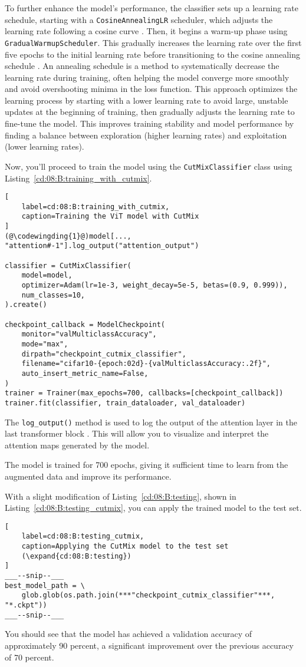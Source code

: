 To further enhance the model's performance, the classifier sets up a learning rate schedule, starting with a \lstinline{CosineAnnealingLR} scheduler, which adjusts the learning rate following a cosine curve . Then, it begins a warm-up phase using \lstinline{GradualWarmupScheduler}.  This gradually increases the learning rate over the first five epochs to the initial learning rate before transitioning to the cosine annealing schedule . An annealing schedule is a method to systematically decrease the learning rate during training, often helping the model converge more smoothly and avoid overshooting minima in the loss function. This approach optimizes the learning process by starting with a lower learning rate to avoid large, unstable updates at the beginning of training, then gradually adjusts the learning rate to fine-tune the model. This improves training stability and model performance by finding a balance between exploration (higher learning rates) and exploitation (lower learning rates).

Now, you'll proceed to train the model using the \lstinline{CutMixClassifier} class using Listing~\ref{cd:08:B:training_with_cutmix}. 
\begin{lstlisting}[
    label=cd:08:B:training_with_cutmix,
    caption=Training the ViT model with CutMix
]
(@\codewingding{1}@)model[..., "attention#-1"].log_output("attention_output")

classifier = CutMixClassifier(
    model=model,
    optimizer=Adam(lr=1e-3, weight_decay=5e-5, betas=(0.9, 0.999)),
    num_classes=10,
).create()

checkpoint_callback = ModelCheckpoint(
    monitor="valMulticlassAccuracy",
    mode="max",
    dirpath="checkpoint_cutmix_classifier",
    filename="cifar10-{epoch:02d}-{valMulticlassAccuracy:.2f}",
    auto_insert_metric_name=False,
)
trainer = Trainer(max_epochs=700, callbacks=[checkpoint_callback])
trainer.fit(classifier, train_dataloader, val_dataloader)
\end{lstlisting}
The \lstinline{log_output()} method is used to log the output of the attention layer in the last transformer block . This will allow you to visualize and interpret the attention maps generated by the model.

The model is trained for 700 epochs, giving it sufficient time to learn from the augmented data and improve its performance.

With a slight modification of Listing~\ref{cd:08:B:testing}, shown in Listing~\ref{cd:08:B:testing_cutmix}, you can apply the trained model to the test set.
\begin{lstlisting}[
    label=cd:08:B:testing_cutmix,
    caption=Applying the CutMix model to the test set
    (\expand{cd:08:B:testing})
]
___--snip--___
best_model_path = \
    glob.glob(os.path.join(***"checkpoint_cutmix_classifier"***, "*.ckpt"))
___--snip--___
\end{lstlisting}
You should see that the model has achieved a validation accuracy of approximately 90 percent, a significant improvement over the previous accuracy of 70 percent.

